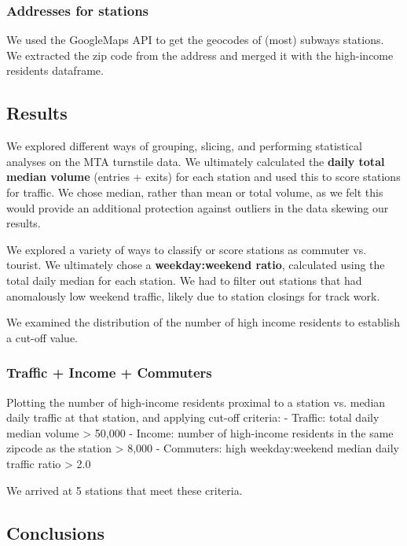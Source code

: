 \documentclass[11pt]{article}
\begin{document}
    \subsubsection{Addresses for stations}\label{addresses-for-stations}

We used the GoogleMaps API to get the geocodes of (most) subways
stations. We extracted the zip code from the address and merged it with
the high-income residents dataframe.

    \subsection{Results}\label{results}

We explored different ways of grouping, slicing, and performing
statistical analyses on the MTA turnstile data. We ultimately calculated
the \textbf{daily total median volume} (entries + exits) for each
station and used this to score stations for traffic. We chose median,
rather than mean or total volume, as we felt this would provide an
additional protection against outliers in the data skewing our results.

We explored a variety of ways to classify or score stations as commuter
vs. tourist. We ultimately chose a \textbf{weekday:weekend ratio},
calculated using the total daily median for each station. We had to
filter out stations that had anomalously low weekend traffic, likely due
to station closings for track work.

We examined the distribution of the number of high income residents to
establish a cut-off value.

    \subsubsection{Traffic + Income +
Commuters}\label{traffic-income-commuters}

Plotting the number of high-income residents proximal to a station vs.
median daily traffic at that station, and applying cut-off criteria: -
Traffic: total daily median volume \textgreater{} 50,000 - Income:
number of high-income residents in the same zipcode as the station
\textgreater{} 8,000 - Commuters: high weekday:weekend median daily
traffic ratio \textgreater{} 2.0

    

    We arrived at 5 stations that meet these criteria.

    \subsection{Conclusions}\label{conclusions}
\end{document}
